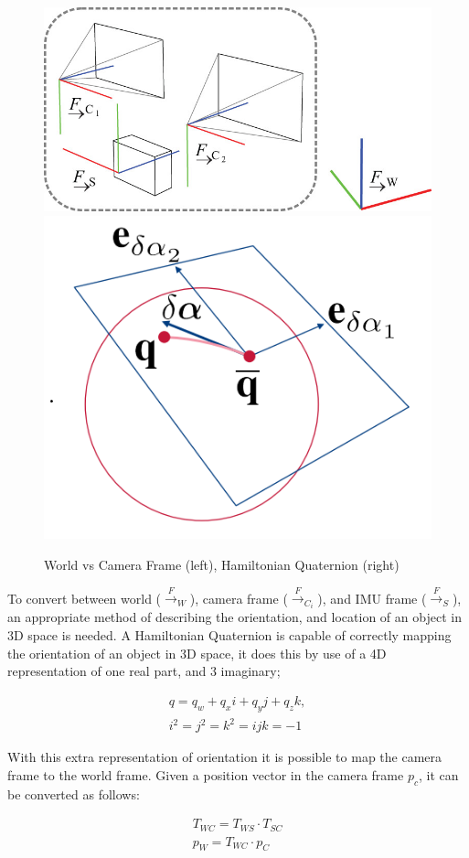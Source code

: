 \documentclass[a4paper,11pt,notitlepage]{article}
\begin{document}
\noindent \begin{figure}[h!]
\includegraphics[width = 0.5\hsize]{figures/world_to_cam.jpg}
\includegraphics[width = 0.35\hsize]{figures/quaternions.png}
\caption{World vs Camera Frame (left)\cite{Okvis_1}, Hamiltonian Quaternion (right)}
\label{quat_wcs}
\end{figure}


To convert between world (${\xrightarrow{F}}_{W}$), camera frame (${\xrightarrow{F}}_{C_{i}}$), and IMU frame (${\xrightarrow{F}}_{S}$), an appropriate method of describing the orientation, and location of an object in 3D space is needed. A Hamiltonian Quaternion is capable of correctly mapping the orientation of an object in 3D space, it does this by use of a 4D representation of one real part, and 3 imaginary;  

\begin{equation}
\begin{aligned}
\label{quaternion}
q = q_{w} + q_{x}i + q_{y}j+q_{z}k, \\
i^{2}=j^{2}=k^{2}=ijk=-1
\end{aligned}
\end{equation}

With this extra representation of orientation it is possible to map the camera frame to the world frame. Given a position vector in the camera frame $p_{c}$, it can be converted as follows:


\begin{equation}
\begin{aligned}
T_{WC} = T_{WS} \cdot T_{SC} \\
p_{W} = T_{WC} \cdot p_{C} \\
\end{aligned}
\end{equation}
\end{document}
